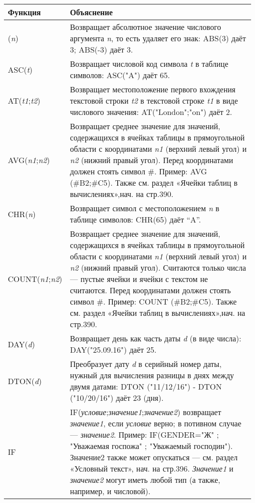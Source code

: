 ﻿\documentclass[a4paper,10pt]{article}
\begin{document}
\begin{center}
\begin{longtable}{  m{3cm} | m{13cm}  }
 \textbf{Функция} & \textbf{Объяснение}\\ 
 \hline
  \index{ABS}(\textit{n}) & Возвращает абсолютное значение числового аргумента \textit{n}, то есть удаляет его знак: ABS(3) даёт 3; ABS(-3) даёт 3.\\
  \hline
  ASC(\textit{t}) & Возвращает числовой код символа \textit{t} в таблице символов: ASC("A") даёт 65. \\ 
  \hline
AT(\textit{t1};\textit{t2}) & Возвращает местоположение первого вхождения текстовой строки \textit{t2} в текстовой строке \textit{t1} в виде числового значения: AT("London";"on") даёт 2.\\
\hline
AVG(\textit{n1};\textit{n2}) & Возвращает среднее значение для значений, содержащихся в ячейках таблицы в прямоугольной области с координатами \textit{n1} (верхний левый угол) и \textit{n2} (нижний правый угол). Перед координатами должен стоять символ \#. Пример: AVG (\#B2;\#C5). Также см. раздел «Ячейки таблиц в вычислениях»,нач. на стр.390.\\
\hline
CHR(\textit{n}) & Возвращает символ с местоположением \textit{n} в таблице символов: CHR(65) даёт “A”.\\
\hline
COUNT(\textit{n1};\textit{n2}) & Возвращает среднее значение для значений, содержащихся в ячейках таблицы в прямоугольной области с координатами \textit{n1} (верхний левый угол) и \textit{n2} (нижний правый угол). Считаются только числа — пустые ячейки и ячейки с текстом не считаются. Перед координатами должен стоять символ \#. Пример: COUNT (\#B2;\#C5). Также см. раздел «Ячейки таблиц в вычислениях»,нач. на стр.390.\\
\hline
DAY(\textit{d}) & Возвращает день как часть даты \textit{d} (в виде числа): DAY("25.09.16") даёт 25.\\
\hline
DTON(\textit{d}) & Преобразует дату \textit{d} в серийный номер даты, нужный для вычисления разницы в днях между двумя датами: DTON ("11/12/16") - DTON ("10/20/16") даёт 23 (дня).\\
\hline
IF & IF(\textit{условие};\textit{значение1};\textit{значение2}) возвращает \textit{значение1}, если \textit{условие} верно; в потивном случае — \textit{значение2}. Пример: IF(GENDER="Ж" ; "Уважаемая госпожа" ; "Уважаемый господин"). Значение2 также может опускаться — см. раздел «Условный текст», нач. на стр.396. \textit{Значение1} и \textit{значение2} могут иметь любой тип (а также, например, и числовой).\\

\end{longtable}
\end{center}
\end{document}
